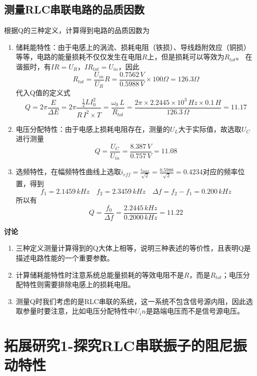 \documentclass[12pt]{article}
\begin{document}
\subsection{测量RLC串联电路的品质因数}
\quad 根据Q的三种定义，计算得到电路的品质因数为
\begin{enumerate}
    \item 储耗能特性：由于电感上的涡流、损耗电阻（铁损）、导线趋附效应（铜损）等等，电路的能量损耗不仅仅发生在电阻$R$上，但是损耗可以等效为$R_{tot}$。
    在谐振时，有$IR=U_R$，$IR_{tot}=U_{in}$，因此
    \[
        R_{tot} = \frac {U_{in}}{U_R}R=\frac {0.7562\,V}{0.5988\,V}\times 100\Omega=126.3\Omega
    \]
    代入Q值的定义式
    \[
        Q = 2\pi \frac {E}{\Delta E}= 2\pi\frac {\frac {1}{2}LI_{0}^{2}}{R\,\overline{I^2}\times T}= \frac {\omega_0\,L}{R_{tot}}=\frac {2\pi\times 2.2445\times 10^3\,Hz\times 0.1\,H}{126.3\,\Omega}=11.17
    \]
    \item 电压分配特性：由于电感上损耗电阻存在，测量的$U_L$大于实际值，故选取$U_C$进行测量
    \[
        Q = \frac {U_C}{U_{in}}=\frac {8.387\,V}{0.757\,V}=11.08
    \]
    \item 选频特性，在幅频特性曲线上选取$i_{eff}=\frac {i_{max}}{\sqrt{2}}=\frac {0.5988}{\sqrt{2}}=0.4234$对应的频率位置，得到
    \[
            f_1=2.1459\,kHz \quad f_2=2.3459\,kHz \quad \Delta f=f_2-f_1=0.200\,kHz
    \]
    所以有
    \[
        Q=\frac {f_0}{\Delta f}=\frac {2.2445\,kHz}{0.2000\,kHz}=11.22
    \]
\end{enumerate}
\textbf{讨论}
\begin{enumerate}
    \item 三种定义测量计算得到的Q大体上相等，说明三种表述的等价性，且表明Q是描述电路性能的一个重要参数。
    \item 计算储耗能特性时注意系统总能量损耗的等效电阻不是$R$，而是$R_{tot}$；电压分配特性则需要排除电感上的损耗电阻。
    \item 测量Q时我们考虑的是RLC串联的系统，这一系统不包含信号源内阻，因此选取参量时要注意，比如电压分配特性中$U_in$是路端电压而不是信号源电压。
\end{enumerate}
\section{拓展研究1-探究RLC串联振子的阻尼振动特性}
\end{document}

